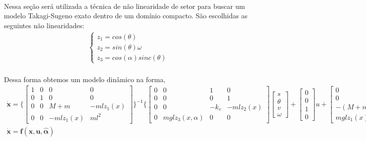 \documentclass[a4paper,10pt]{article}
\begin{document}
\paragraph{}Nessa seção será utilizada a técnica de não linearidade de setor para buscar um modelo Takagi-Sugeno exato dentro de um domínio compacto. São escolhidas as seguintes não linearidades:
\begin{gather}
	\begin{cases}
		z_1 = cos(\theta) \\
		z_2 = sin(\theta)\omega \\
		z_3 = cos(\alpha)sinc(\theta)
	\end{cases}
\end{gather}
 \paragraph{}Dessa forma obtemos um modelo dinâmico na forma,
 \begin{gather}
 	 	\dot{\bm{x}} =  
 	 	\Biggl\{\begin{bmatrix}
 	 		1 & 0 & 0 & 0 \\
 	 		0 & 1 & 0 & 0 \\
 	 		0 & 0 & M+m & -mlz_1(x) \\
 	 		0 & 0 & -mlz_1(x) & ml^2
 	 	\end{bmatrix}\Biggr\}^{-1}	\Biggl\{\begin{bmatrix}
 			0 & 0 & 1 & 0 \\
 			0 & 0 & 0 & 1 \\
 			0 & 0 & -k_v & -mlz_2(x) \\
 			0 & mglz_3(x,\alpha) & 0 & 0
 		\end{bmatrix}\begin{bmatrix}
 			s \\ \theta \\ v \\ \omega
 		\end{bmatrix} 
 		+ \begin{bmatrix}
 			0 \\ 0 \\ 1 \\ 0
 		\end{bmatrix}u + \begin{bmatrix}
 			0 \\ 0 \\ -(M+m)g \\ mglz_1(x)
 		\end{bmatrix}\bar{\alpha}	\Biggl\} \\
 	\dot{\bm{x}} = \bm{f(\bm{x},\bm{u},\bm{\hat{\alpha}})}
 \end{gather}
\end{document}
